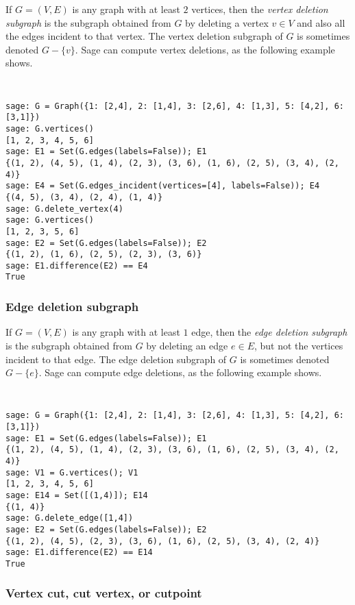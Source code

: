 If $G = (V,E)$ is any graph with at least $2$ vertices, then the
\emph{vertex deletion subgraph} is the subgraph obtained from $G$ by
deleting a vertex $v \in V$ and also all the edges incident to that
vertex. The vertex deletion subgraph of $G$ is sometimes denoted
$G - \{v\}$.
Sage can compute vertex deletions, as the following example shows.
%
\begin{center}
\fontsize{9pt}{9pt}
\selectfont
\tt
\begin{lstlisting}
sage: G = Graph({1: [2,4], 2: [1,4], 3: [2,6], 4: [1,3], 5: [4,2], 6: [3,1]})
sage: G.vertices()
[1, 2, 3, 4, 5, 6]
sage: E1 = Set(G.edges(labels=False)); E1
{(1, 2), (4, 5), (1, 4), (2, 3), (3, 6), (1, 6), (2, 5), (3, 4), (2, 4)}
sage: E4 = Set(G.edges_incident(vertices=[4], labels=False)); E4
{(4, 5), (3, 4), (2, 4), (1, 4)}
sage: G.delete_vertex(4)
sage: G.vertices()
[1, 2, 3, 5, 6]
sage: E2 = Set(G.edges(labels=False)); E2
{(1, 2), (1, 6), (2, 5), (2, 3), (3, 6)}
sage: E1.difference(E2) == E4
True
\end{lstlisting}
\end{center}


\subsubsection{Edge deletion subgraph}

If $G = (V,E)$ is any graph with at least $1$ edge, then the
\emph{edge deletion subgraph} is the subgraph obtained from $G$ by
deleting an edge $e \in E$, but not the vertices incident to that edge.
The edge deletion subgraph of $G$ is sometimes denoted $G - \{e\}$.
Sage can compute edge deletions, as the following example shows.
%
\begin{center}
\fontsize{9pt}{9pt}
\selectfont
\tt
\begin{lstlisting}
sage: G = Graph({1: [2,4], 2: [1,4], 3: [2,6], 4: [1,3], 5: [4,2], 6: [3,1]})
sage: E1 = Set(G.edges(labels=False)); E1
{(1, 2), (4, 5), (1, 4), (2, 3), (3, 6), (1, 6), (2, 5), (3, 4), (2, 4)}
sage: V1 = G.vertices(); V1
[1, 2, 3, 4, 5, 6]
sage: E14 = Set([(1,4)]); E14
{(1, 4)}
sage: G.delete_edge([1,4])
sage: E2 = Set(G.edges(labels=False)); E2
{(1, 2), (4, 5), (2, 3), (3, 6), (1, 6), (2, 5), (3, 4), (2, 4)}
sage: E1.difference(E2) == E14
True
\end{lstlisting}
\end{center}


\subsubsection{Vertex cut, cut vertex, or cutpoint}

